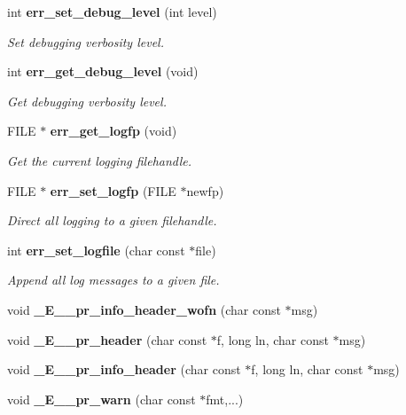 \begin{CompactItemize}
\item 
int {\bf err\_\-set\_\-debug\_\-level} (int level)
\begin{CompactList}\small\item\em Set debugging verbosity level. \item\end{CompactList}\item 
int {\bf err\_\-get\_\-debug\_\-level} (void)
\begin{CompactList}\small\item\em Get debugging verbosity level. \item\end{CompactList}\item 
FILE $\ast$ {\bf err\_\-get\_\-logfp} (void)
\begin{CompactList}\small\item\em Get the current logging filehandle. \item\end{CompactList}\item 
FILE $\ast$ {\bf err\_\-set\_\-logfp} (FILE $\ast$newfp)
\begin{CompactList}\small\item\em Direct all logging to a given filehandle. \item\end{CompactList}\item 
int {\bf err\_\-set\_\-logfile} (char const $\ast$file)
\begin{CompactList}\small\item\em Append all log messages to a given file. \item\end{CompactList}\item 
void \textbf{\_\-E\_\-\_\-pr\_\-info\_\-header\_\-wofn} (char const $\ast$msg)\label{err_8c_fd2e78db5fc2b29d87b434d0a2d0d07e}

\item 
void \textbf{\_\-E\_\-\_\-pr\_\-header} (char const $\ast$f, long ln, char const $\ast$msg)\label{err_8c_5ff468fc371d3fd651257df3819e412a}

\item 
void \textbf{\_\-E\_\-\_\-pr\_\-info\_\-header} (char const $\ast$f, long ln, char const $\ast$msg)\label{err_8c_f0a195f2b0f1f9fc2ef7d60593b66faa}

\item 
void \textbf{\_\-E\_\-\_\-pr\_\-warn} (char const $\ast$fmt,...)\label{err_8c_8cdfd1775cf364e5705bb00a262c7865}


\end{CompactItemize}
